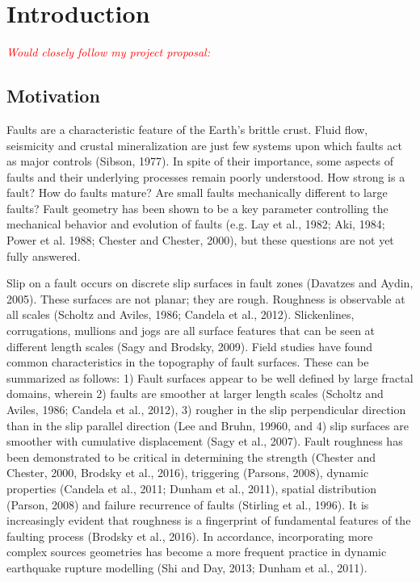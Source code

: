 \documentclass[12pt,a4paper]{article}
\begin{document}
\section{Introduction}

\textcolor{red}{\textit{
Would closely follow my project proposal:}}

\subsection{Motivation}

Faults are a characteristic feature of the Earth’s brittle crust. Fluid flow, seismicity and crustal mineralization are just few systems upon which faults act as major controls (Sibson, 1977). In spite of their importance, some aspects of faults and their underlying processes remain poorly understood. How strong is a fault? How do faults mature? Are small faults mechanically different to large faults? Fault geometry has been shown to be a key parameter controlling the mechanical behavior and evolution of faults (e.g. Lay et al., 1982; Aki, 1984; Power et al. 1988; Chester and Chester, 2000), but these questions are not yet fully answered.

Slip on a fault occurs on discrete slip surfaces in fault zones (Davatzes and Aydin, 2005). These surfaces are not planar; they are rough. Roughness is observable at all scales (Scholtz and Aviles, 1986; Candela et al., 2012). Slickenlines, corrugations, mullions and jogs are all  surface features that can be seen at different length scales (Sagy and Brodsky, 2009). Field studies have found common characteristics in the topography of fault surfaces. These can be summarized as follows: 1) Fault surfaces appear to be well defined by large fractal domains, wherein 2) faults are smoother at larger length scales (Scholtz and Aviles, 1986; Candela et al., 2012), 3) rougher in the slip perpendicular direction than in the slip parallel direction (Lee and Bruhn, 19960, and 4) slip surfaces are smoother with cumulative displacement (Sagy et al., 2007). Fault roughness has been demonstrated to be critical in determining the strength (Chester and Chester, 2000, Brodsky et al., 2016), triggering (Parsons, 2008), dynamic properties (Candela et al., 2011; Dunham et al., 2011), spatial distribution (Parson, 2008) and failure recurrence of faults (Stirling et al., 1996). It is increasingly evident that roughness is a fingerprint of fundamental features of the faulting process (Brodsky et al., 2016). In accordance, incorporating more complex sources geometries has become a more frequent practice in dynamic earthquake rupture modelling (Shi and Day, 2013; Dunham et al., 2011). 
\end{document}
